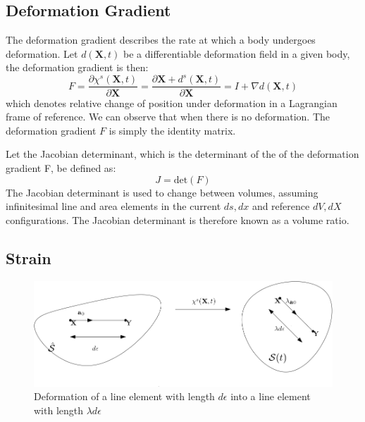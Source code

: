 \subsection{Deformation Gradient}
The deformation gradient describes the rate at which a body undergoes deformation.
Let $d(\textbf{X},t)$ be a differentiable deformation field in a given body, the deformation gradient is then:  
\begin{equation}
\label{eq:deformation_gradient}
F = \frac{\partial \chi^s(\textbf{X},t)}{\partial \textbf{X}} = \frac{\partial \textbf{X}  + d^s(\textbf{X} ,t) }{\partial \textbf{X}} =  I + \nabla d(\textbf{X},t) 
\end{equation}
which denotes relative change of position under deformation in a Lagrangian frame of reference. We can observe that when there is no deformation. The deformation gradient $F$ is simply the identity matrix. \newline

Let the Jacobian determinant, which is the determinant of the of the deformation gradient F, be defined as:
\begin{equation}\label{eq:J}
J = \text{det}(F)
\end{equation}
The Jacobian determinant is used to change between volumes, assuming infinitesimal line and area elements in the current $ds, dx$ and reference $dV,dX$ configurations. The Jacobian determinant is therefore known as a volume ratio.

\subsection{Strain}
\begin{figure}[H]
\includegraphics[scale=0.40]{./Solid_equations/Strain.png}
\caption{Deformation of a line element with length $d\epsilon$ into a line element with length $\lambda d \epsilon$}
\end{figure}

